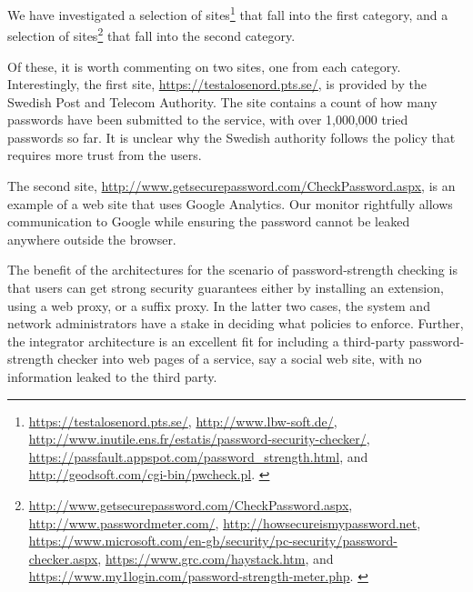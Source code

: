 \documentclass{llncs}
\begin{document}
We have investigated a selection of sites\footnote{\scriptsize{
\url{https://testalosenord.pts.se/},
\url{http://www.lbw-soft.de/},
\url{http://www.inutile.ens.fr/estatis/password-security-checker/},
\url{https://passfault.appspot.com/password_strength.html}, and
\url{http://geodsoft.com/cgi-bin/pwcheck.pl}.
}
}
that fall into the first category, and a selection of sites\footnote{\scriptsize{
\url{http://www.getsecurepassword.com/CheckPassword.aspx},
\url{http://www.passwordmeter.com/},
\url{http://howsecureismypassword.net},
\url{https://www.microsoft.com/en-gb/security/pc-security/password-checker.aspx},
\url{https://www.grc.com/haystack.htm}, and
\url{https://www.my1login.com/password-strength-meter.php}.
}
}
that fall into the second category.

Of these, it is worth commenting on two sites, one from each category.  Interestingly, the first
site, {\footnotesize{\url{https://testalosenord.pts.se/}}}, is provided by
the Swedish Post and Telecom Authority. The site contains a count of how many
passwords have been submitted to the service, with over 1,000,000 tried
passwords so far. It is unclear why the Swedish authority follows the policy
that requires more trust from the users.

The second
site, {\footnotesize{\url{http://www.getsecurepassword.com/CheckPassword.aspx}}}, is
an example of a web site that uses Google Analytics. Our monitor rightfully
allows communication to Google while ensuring the password cannot be leaked
anywhere outside the browser. 

The benefit of the architectures for the scenario of password-strength checking is
that users can get strong security guarantees either by installing an
extension, using a web proxy, or a suffix proxy. In the latter two
cases, the system and network administrators have a stake in deciding
what policies to enforce. Further, the integrator architecture is an
excellent fit for including a third-party password-strength checker
into web pages of a service, say a social web site, with no
information leaked to the third party.
\end{document}
